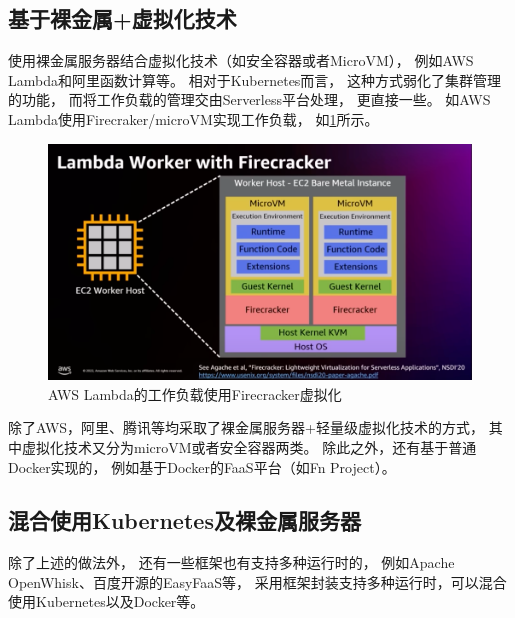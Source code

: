 \subsection{基于裸金属+虚拟化技术}
使用裸金属服务器结合虚拟化技术（如安全容器或者MicroVM），
例如AWS Lambda和阿里函数计算等。
相对于Kubernetes而言，
这种方式弱化了集群管理的功能，
而将工作负载的管理交由Serverless平台处理，
更直接一些。
如AWS Lambda使用Firecraker/microVM实现工作负载，
如\cref{lambda_worker}所示。

\begin{figure}[ht!]
    \centering
    \includegraphics[width=\linewidth]{images/lambda_worker.png}
    \caption{AWS Lambda的工作负载使用Firecracker虚拟化\cite{aws_lambda_2022}}
    \label{lambda_worker}
\end{figure}

除了AWS，阿里、腾讯等均采取了裸金属服务器+轻量级虚拟化技术的方式，
其中虚拟化技术又分为microVM或者安全容器两类。
除此之外，还有基于普通Docker实现的，
例如基于Docker的FaaS平台（如Fn Project）。

\subsection{混合使用Kubernetes及裸金属服务器}
除了上述的做法外，
还有一些框架也有支持多种运行时的，
例如Apache OpenWhisk、百度开源的EasyFaaS等，
采用框架封装支持多种运行时，可以混合使用Kubernetes以及Docker等。
